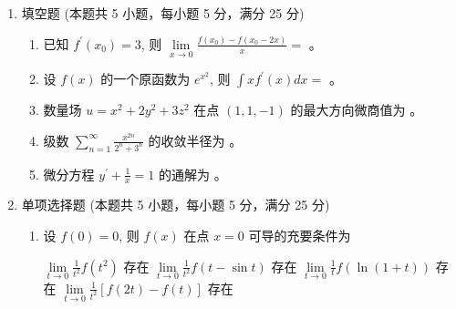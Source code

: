 

\begin{enumerate}
	\item
	填空题 (本题共 5 小题，每小题 5 分，满分 25 分)
	\begin{enumerate}
		\item
		已知 $f^{\prime}\left(x_{0}\right)=3$, 则 $\lim\limits _{x \rightarrow 0} \frac{f\left(x_{0}\right)-f\left(x_{0}-2 x\right)}{x}=$  。
		
		
		\item
		 设 $f(x)$ 的一个原函数为 $e^{x^{2}}$, 则 $\int x f^{\prime}(x) d x=$  。
		
		
		
		
		\item
		数量场 $u=x^{2}+2 y^{2}+3 z^{2}$ 在点 $(1,1,-1)$ 的最大方向微商值为  。
		
		
		\item
		级数 $\sum\limits_{n=1}^{\infty} \frac{x^{2 n}}{2^{n}+3^{n}}$ 的收敛半径为  。
		
		
		\item
		微分方程 $y^{\prime}+\frac{1}{x}=1$ 的通解为  。
		
		
	\end{enumerate}
	
\item 
单项选择题 (本题共 5 小题，每小题 5 分，满分 25 分)
\begin{enumerate}
	\item
	设 $f(0)=0$, 则 $f(x)$ 在点 $x=0$ 可导的充要条件为  
	
	
\fourchoices
{$\lim\limits _{t \rightarrow 0} \frac{1}{t^{2}} f\left(t^{2}\right)$ 存在}
{$\lim\limits _{t \rightarrow 0} \frac{1}{t^{2}} f(t-\sin t)$ 存在}
{$\lim\limits _{t \rightarrow 0} \frac{1}{t} f(\ln (1+t))$ 存在}
{$\lim\limits _{t \rightarrow 0} \frac{1}{t^{2}}[f(2 t)-f(t)]$ 存在}


\end{enumerate}
\end{enumerate}
